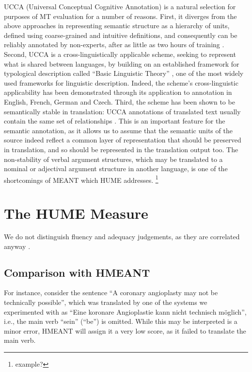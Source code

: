 \documentclass[11pt]{article}
\newcommand{\oa}[1]{\footnote{\color{red} #1}}
\begin{document}
UCCA (Universal Conceptual Cognitive Annotation) is a natural selection for purposes of MT evaluation
for a number of reasons. 
First, it diverges from the above approaches in representing
semantic structure as a hierarchy of units, defined using coarse-grained and intuitive definitions,
and consequently can be reliably annotated by non-experts, after as little as two hours
of training \cite{marinotti2014}.
Second, UCCA is a cross-linguistically applicable scheme, seeking to represent what is shared between languages,
by building on an established framework for typological description called
``Basic Linguistic Theory'' \cite[BLT]{Dixon:10a,Dixon:10b,Dixon:12},
one of the most widely used frameworks for linguistic description.
Indeed, the scheme's cross-linguistic applicability has been demonstrated through its
application to annotation in English, French, German and Czech. 
Third, the scheme has been shown to be semantically stable
in translation: UCCA annotations of translated text usually contain the same set of relationships
\cite{sulem2012}. This is an important feature for the semantic annotation, as it allows us to
assume that the semantic units of the source indeed reflect a common layer of representation that
should be preserved in translation, and so should be represented in the translation output too.
The non-stability of verbal argument structures, which may be translated to a nominal or adjectival
argument structure in another language, is one of the shortcomings of MEANT which HUME addresses.
\oa{example?}

\section{The HUME Measure}\label{sec:hume}


We do not distinguish fluency and adequacy judgements, as they are correlated anyway \cite{ccb}.

\subsection{Comparison with HMEANT}\label{sec:hmeant_comp}

For instance, consider the sentence ``A coronary angioplasty may not be technically possible'',
which was translated by one of the systems we experimented with as
``Eine koronare Angioplastie kann nicht technisch m{\"o}glich'', i.e., the main verb ``sein'' (``be'') is omitted.
While this may be interpreted is a minor error, HMEANT will assign it a very low score, as it failed to
translate the main verb. 
\end{document}
